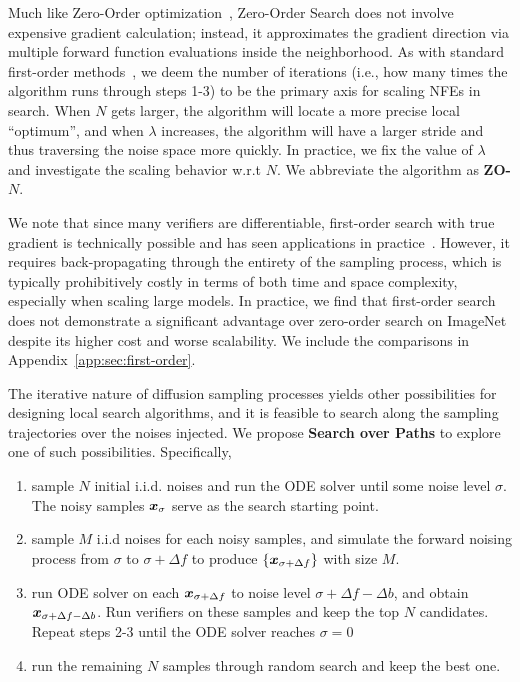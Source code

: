 Much like Zero-Order optimization~\citep{flaxman2004online}, Zero-Order Search does not involve expensive gradient calculation; instead, it approximates the gradient direction via multiple forward function evaluations inside the neighborhood. As with standard first-order methods~\citep{ruder2016overview}, we deem the number of iterations (i.e., how many times the algorithm runs through steps 1-3) to be the primary axis for scaling NFEs in search. When $N$ gets larger, the algorithm will locate a more precise local ``optimum'', and when $\lambda$ increases, the algorithm will have a larger stride and thus traversing the noise space more quickly. In practice, we fix the value of $\lambda$ and investigate the scaling behavior w.r.t $N$. We abbreviate the algorithm as \textbf{ZO-$N$}.


We note that since many verifiers are differentiable, first-order search with true gradient is technically possible and has seen applications in practice~\citep{novack2024ditto,ben2024d}. However, it requires back-propagating through the entirety of the sampling process, which is typically prohibitively costly in terms of both time and space complexity, especially when scaling large models. In practice, we find that first-order search does not demonstrate a significant advantage over zero-order search on ImageNet despite its higher cost and worse scalability. We include the comparisons in Appendix~\ref{app:sec:first-order}.


The iterative nature of diffusion sampling processes yields other possibilities for designing local search algorithms, and it is feasible to search along the sampling trajectories over the noises injected. We propose \textbf{Search over Paths} to explore one of such possibilities. Specifically, 
%
\begin{enumerate}
    \item sample $N$ initial i.i.d. noises and run the ODE solver until some noise level $\sigma$. The noisy samples $\boldsymbol{x}_\sigma$ serve as the search starting point.
    \item sample $M$ i.i.d noises for each noisy samples, and simulate the forward noising process from $\sigma$ to $\sigma + \Delta f$ to produce $\{\boldsymbol{x}_{\sigma+\Delta f}\}$ with size $M$.
    \item run ODE solver on each $\boldsymbol{x}_{\sigma+\Delta f}$ to noise level $\sigma+\Delta f-\Delta b$, and obtain $\boldsymbol{x}_{\sigma+\Delta f-\Delta b}$. Run verifiers on these samples and keep the top $N$ candidates. Repeat steps 2-3 until the ODE solver reaches $\sigma=0$
    \item run the remaining $N$ samples through random search and keep the best one.
\end{enumerate}


